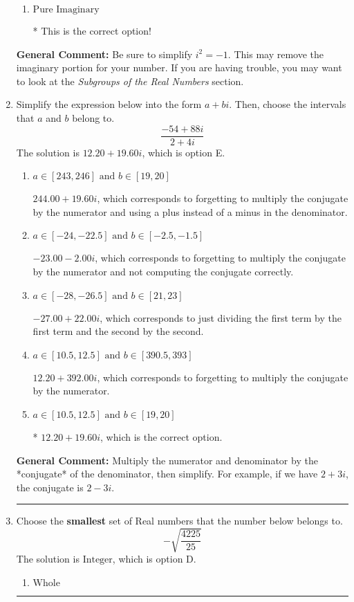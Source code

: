 \documentclass{extbook}[14pt]
\newcommand{\litem}[1]{\item #1

\rule{\textwidth}{0.4pt}}
\begin{document}
\begin{enumerate}
{\begin{enumerate}[label=\Alph*.]
This is not a number. The only non-Complex number we know is dividing by 0 as this is not a number!
\item \( \text{Pure Imaginary} \)

* This is the correct option!
\end{enumerate}

\textbf{General Comment:} Be sure to simplify $i^2 = -1$. This may remove the imaginary portion for your number. If you are having trouble, you may want to look at the \textit{Subgroups of the Real Numbers} section.
}
\litem{
Simplify the expression below into the form $a+bi$. Then, choose the intervals that $a$ and $b$ belong to.
\[ \frac{-54 + 88 i}{2 + 4 i} \]The solution is \( 12.20  + 19.60 i \), which is option E.\begin{enumerate}[label=\Alph*.]
\item \( a \in [243, 246] \text{ and } b \in [19, 20] \)

 $244.00  + 19.60 i$, which corresponds to forgetting to multiply the conjugate by the numerator and using a plus instead of a minus in the denominator.
\item \( a \in [-24, -22.5] \text{ and } b \in [-2.5, -1.5] \)

 $-23.00  - 2.00 i$, which corresponds to forgetting to multiply the conjugate by the numerator and not computing the conjugate correctly.
\item \( a \in [-28, -26.5] \text{ and } b \in [21, 23] \)

 $-27.00  + 22.00 i$, which corresponds to just dividing the first term by the first term and the second by the second.
\item \( a \in [10.5, 12.5] \text{ and } b \in [390.5, 393] \)

 $12.20  + 392.00 i$, which corresponds to forgetting to multiply the conjugate by the numerator.
\item \( a \in [10.5, 12.5] \text{ and } b \in [19, 20] \)

* $12.20  + 19.60 i$, which is the correct option.
\end{enumerate}

\textbf{General Comment:} Multiply the numerator and denominator by the *conjugate* of the denominator, then simplify. For example, if we have $2+3i$, the conjugate is $2-3i$.
}
\litem{
Choose the \textbf{smallest} set of Real numbers that the number below belongs to.
\[ -\sqrt{\frac{4225}{25}} \]The solution is \( \text{Integer} \), which is option D.\begin{enumerate}[label=\Alph*.]
\item \( \text{Whole} \)


\end{enumerate}}
\end{enumerate}
\end{document}

